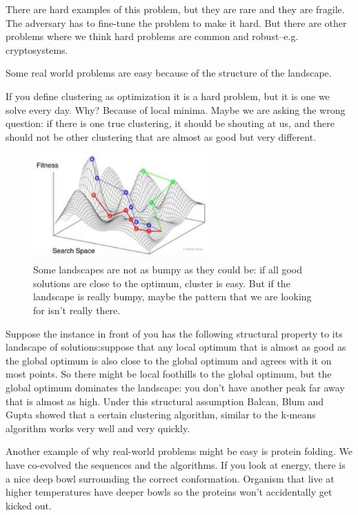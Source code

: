 \documentclass[]{article}
\begin{document}
There are hard examples of this problem, but they are rare and they are fragile. The adversary has to fine-tune the problem to make it hard. But there are other problems where we think hard problems are common and robust--e.g. cryptosystems.

Some real world problems are easy because of the structure of the landscape.

If you define clustering as optimization it is a hard problem, but it is one we solve every day. Why? Because of local minima. Maybe we are asking the wrong question: if there is one true clustering, it should be shouting at us, and there should not be other clustering that are almost as good but very different.

\begin{figure}[H]
	\begin{center}
		\caption[Some landscapes are not as bumpy as they could be]{Some landscapes are not as bumpy as they could be: if all good solutions are close to the optimum, cluster is easy. But if the landscape is really bumpy, maybe the pattern that we are looking for isn't really there.}\label{fig:rw-problems-easy}
		\includegraphics[width=0.6\textwidth]{rw-problems-easy}
	\end{center}
\end{figure}

Suppose the instance in front of you has the following structural property to its landscape of solutions:suppose that any local optimum that is almost as good as the global optimum is also close to the global optimum and agrees with it on most points. So there might be local foothills to the global optimum, but the global optimum dominates the landscape: you don't have another peak far away that is almost as high. Under this structural assumption Balcan, Blum and Gupta\cite{balcan2013clustering} showed that a certain clustering algorithm, similar to the k-means algorithm works very well and very quickly.

Another example of why real-world problems might be easy is protein folding. We have co-evolved the  sequences and the algorithms. If you look at energy, there is a nice deep bowl surrounding the correct conformation. Organism that live at higher temperatures have deeper bowls so the proteins won't accidentally get kicked out. 
\end{document}
